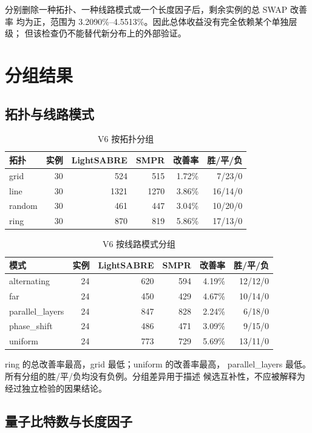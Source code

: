 \documentclass[11pt,a4paper]{article}
\begin{document}
分别删除一种拓扑、一种线路模式或一个长度因子后，剩余实例的总 SWAP 改善率
均为正，范围为 3.2090\%--4.5513\%。因此总体收益没有完全依赖某个单独层级；
但该检查仍不能替代新分布上的外部验证。

\section{分组结果}

\subsection{拓扑与线路模式}

\begin{table}[H]
\centering
\caption{V6 按拓扑分组}
\begin{tabular}{lrrrrr}
\toprule
拓扑 & 实例 & LightSABRE & SMPR & 改善率 & 胜/平/负 \\
\midrule
grid & 30 & 524 & 515 & 1.72\% & 7/23/0 \\
line & 30 & 1321 & 1270 & 3.86\% & 16/14/0 \\
random & 30 & 461 & 447 & 3.04\% & 10/20/0 \\
ring & 30 & 870 & 819 & 5.86\% & 17/13/0 \\
\bottomrule
\end{tabular}
\end{table}

\begin{table}[H]
\centering
\caption{V6 按线路模式分组}
\begin{tabular}{lrrrrr}
\toprule
模式 & 实例 & LightSABRE & SMPR & 改善率 & 胜/平/负 \\
\midrule
alternating & 24 & 620 & 594 & 4.19\% & 12/12/0 \\
far & 24 & 450 & 429 & 4.67\% & 10/14/0 \\
parallel\_layers & 24 & 847 & 828 & 2.24\% & 6/18/0 \\
phase\_shift & 24 & 486 & 471 & 3.09\% & 9/15/0 \\
uniform & 24 & 773 & 729 & 5.69\% & 13/11/0 \\
\bottomrule
\end{tabular}
\end{table}

ring 的总改善率最高，grid 最低；uniform 的改善率最高，
parallel\_layers 最低。所有分组的胜/平/负均没有负例。分组差异用于描述
候选互补性，不应被解释为经过独立检验的因果结论。

\subsection{量子比特数与长度因子}
\end{document}

